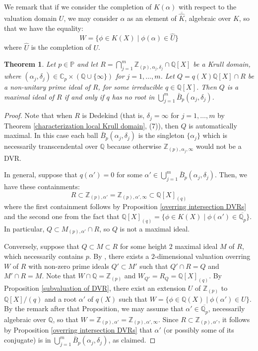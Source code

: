 \documentclass[10pt]{article}
\numberwithin{equation}{section}
\newtheorem{Thm}[equation]{Theorem}
\theoremstyle{definition}
\theoremstyle{definition}
\newcommand{\Q}{\mathbb{Q}}
\newcommand{\Z}{\mathbb{Z}}
\newcommand{\C}{\mathbb{C}}
\newcommand{\PP}{\mathbb{P}}
\newcommand{\oQp}{\overline{\Q_p}}
\begin{document}
We remark that if we consider the completion of $K(\alpha)$ with respect to the valuation domain $U$, we may consider $\alpha$ as an element of $\overline{\widehat{K}}$, algebraic over $K$, so that we have the equality:
$$W=\{\phi\in K(X)\mid \phi(\alpha)\in \widehat{U}\}$$
where $\widehat{U}$ is the completion of $U$.

\begin{Thm}\label{nonunitary prime ideals}
  Let $p\in\PP$ and let $R=\bigcap\limits_{j=1}^m \Z_{(p),\alpha_j,\delta_j}\cap \Q[X]$ be a Krull domain, where $(\alpha_j,\delta_j)\in \C_p\times (\Q\cup\{\infty\})$ for $j=1,\ldots,m$.  Let $Q=q(X)\Q[X]\cap R$ be a non-unitary prime ideal of $R$, for some irreducible $q\in \Q[X]$. Then $Q$ is a maximal ideal of $R$ if and only if $q$ has no root in $\bigcup\limits_{j=1}^m \bar B_p(\alpha_j,\delta_j)$.  
\end{Thm}
\begin{proof}
Note that when $R$ is Dedekind (that is, $\delta_j=\infty$ for $j=1,\ldots,m$ by Theorem \ref{characterization local Krull domain}, (7)), then $Q$ is automatically maximal. In this case each ball $\bar B_p(\alpha_j,\delta_j)$ is the singleton $\{\alpha_j\}$ which is necessarily transcendental over $\Q$ because otherwise $\Z_{(p),\alpha_j,\infty}$ would not be a DVR.

In general, suppose that $q(\alpha')=0$ for some $\alpha'\in\bigcup_{j=1}^m \bar B_p(\alpha_j,\delta_j)$. Then, we have these containments:
$$R\subset\Z_{(p),\alpha'}=\Z_{(p),\alpha',\infty}\subset\Q[X]_{(q)}$$
where the first containment follows by Proposition \ref{overring intersection DVRs} and the second one from the fact that $\Q[X]_{(q)}=\{\phi\in K(X)\mid \phi(\alpha')\in\oQp\}$. In particular, $Q\subset M_{(p),\alpha'}\cap R$, so $Q$ is not a maximal ideal.

Conversely, suppose that $Q\subset M\subset R$ for some height $2$ maximal ideal $M$ of $R$, which necessarily contains $p$.  By \cite[Corollary 19.7]{Gilm}, there exists a $2$-dimensional valuation overring $W$ of $R$ with non-zero prime ideals $Q'\subset M'$ such that $Q'\cap R=Q$ and $M'\cap R=M$. Note that $W\cap \Q=\Z_{(p)}$ and $W_{Q'}=R_Q=\Q[X]_{(q)}$. By Proposition \ref{subvaluation of DVR}, there exist an extension $U$ of $\Z_{(p)}$ to $\Q[X]/(q)$  and a root $\alpha'$ of $q(X)$ such that $W=\{\phi\in\Q(X)\mid \phi(\alpha')\in U\}$. By the remark after that Proposition, we may assume that $\alpha'\in\oQp$, necessarily algebraic over $\Q$, so that $W=\Z_{(p),\alpha'}=\Z_{(p),\alpha',\infty}$. Since $R\subset \Z_{(p),\alpha'}$, it follows by Proposition \ref{overring intersection DVRs} that $\alpha'$ (or possibly some of its conjugate) is in $\bigcup_{j=1}^m \bar B_p(\alpha_j,\delta_j)$, as claimed.
\end{proof}
\end{document}
